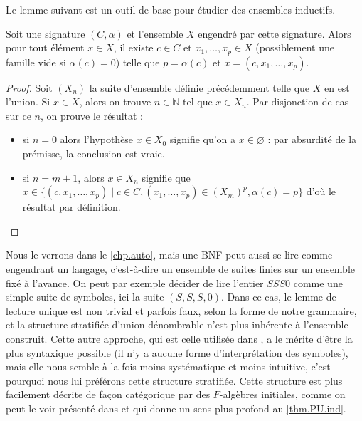 Le lemme suivant est un outil de base pour étudier des ensembles inductifs.

\begin{lemma}
  Soit une signature $(C,\alpha)$ et l'ensemble $X$ engendré par cette
  signature. Alors pour tout élément $x \in X$, il existe $c\in C$ et
  $x_1,\ldots,x_p \in X$ (possiblement une famille vide si $\alpha(c) = 0$)
  telle que $p = \alpha(c)$ et $x = (c,x_1,\ldots,x_p)$.
\end{lemma}

\begin{proof}
  Soit $(X_n)$ la suite d'ensemble définie précédemment telle que $X$ en est
  l'union. Si $x\in X$, alors on trouve $n \in \mathbb N$ tel que $x\in X_n$.
  Par disjonction de cas sur ce $n$, on prouve le résultat :
  \begin{itemize}
  \item si $n = 0$ alors l'hypothèse $x \in X_0$ signifie qu'on a
    $x\in \varnothing$ : par absurdité de la prémisse, la conclusion est vraie.
  \item si $n = m+1$, alors $x\in X_n$ signifie que
    $x \in \{(c,x_1,\ldots,x_p)\mid c\in C, (x_1,\ldots,x_p)\in(X_m)^p,
    \alpha(c) = p\}$ d'où le résultat par définition.
  \end{itemize}
\end{proof}

\begin{remark}
  Nous le verrons dans le \cref{chp.auto}, mais une BNF peut aussi se lire comme
  engendrant un langage, c'est-à-dire un ensemble de suites finies sur un
  ensemble fixé à l'avance. On peut par exemple décider de lire l'entier $SSS0$
  comme une simple suite de symboles, ici la suite $(S,S,S,0)$. Dans ce cas, le
  lemme de lecture unique est non trivial et parfois faux, selon la forme de
  notre grammaire, et la structure stratifiée d'union dénombrable n'est plus
  inhérente à l'ensemble construit. Cette autre approche, qui est celle utilisée
  dans \cite{cori2003logique}, a le mérite d'être la plus syntaxique possible
  (il n'y a aucune forme d'interprétation des symboles), mais elle nous semble à
  la fois moins systématique et moins intuitive, c'est pourquoi nous lui
  préférons cette structure stratifiée. Cette structure est plus facilement
  décrite de façon catégorique par des $F$-algèbres initiales, comme on peut le
  voir présenté dans \cite{JacobsCLTT} et qui donne un sens plus profond au
  \cref{thm.PU.ind}.
\end{remark}

